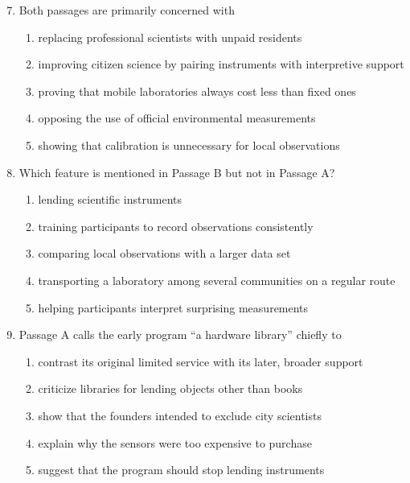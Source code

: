 \begin{enumerate}\setcounter{enumi}{6}
\item Both passages are primarily concerned with
\begin{enumerate}
\item replacing professional scientists with unpaid residents
\item improving citizen science by pairing instruments with interpretive support
\item proving that mobile laboratories always cost less than fixed ones
\item opposing the use of official environmental measurements
\item showing that calibration is unnecessary for local observations
\end{enumerate}

\item Which feature is mentioned in Passage B but not in Passage A?
\begin{enumerate}
\item lending scientific instruments
\item training participants to record observations consistently
\item comparing local observations with a larger data set
\item transporting a laboratory among several communities on a regular route
\item helping participants interpret surprising measurements
\end{enumerate}

\item Passage A calls the early program ``a hardware library'' chiefly to
\begin{enumerate}
\item contrast its original limited service with its later, broader support
\item criticize libraries for lending objects other than books
\item show that the founders intended to exclude city scientists
\item explain why the sensors were too expensive to purchase
\item suggest that the program should stop lending instruments
\end{enumerate}


\end{enumerate}
